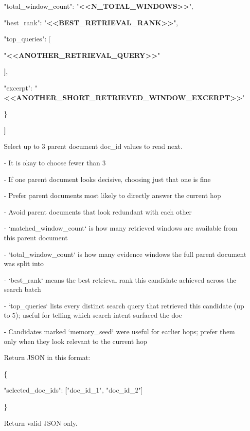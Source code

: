 \begin{tcolorbox}[colback=white, colframe=my-green, coltitle=black, parskip=5mm, title=\textbf{Document Choose}, halign=flush left, enhanced, breakable, skin first=enhanced, skin middle=enhanced, skin last=enhanced]
\begin{scriptsize}
    "total\_window\_count": "\textcolor{my-green}{\textbf{\textless{}\textless{}N\_TOTAL\_WINDOWS\textgreater{}\textgreater{}}}",\par
    "best\_rank": "\textcolor{my-green}{\textbf{\textless{}\textless{}BEST\_RETRIEVAL\_RANK\textgreater{}\textgreater{}}}",\par
    "top\_queries": [\par
      "\textcolor{my-green}{\textbf{\textless{}\textless{}ANOTHER\_RETRIEVAL\_QUERY\textgreater{}\textgreater{}}}"\par
    ],\par
    "excerpt": "\textcolor{my-green}{\textbf{\textless{}\textless{}ANOTHER\_SHORT\_RETRIEVED\_WINDOW\_EXCERPT\textgreater{}\textgreater{}}}"\par
  \}\par
]\par
\mbox{}\par
Select up to 3 parent document doc\_id values to read next.\par
- It is okay to choose fewer than 3\par
- If one parent document looks decisive, choosing just that one is fine\par
- Prefer parent documents most likely to directly answer the current hop\par
- Avoid parent documents that look redundant with each other\par
- `matched\_window\_count` is how many retrieved windows are available from this parent document\par
- `total\_window\_count` is how many evidence windows the full parent document was split into\par
- `best\_rank` means the best retrieval rank this candidate achieved across the search batch\par
- `top\_queries` lists every distinct search query that retrieved this candidate (up to 5); useful for telling which search intent surfaced the doc\par
- Candidates marked `memory\_seed` were useful for earlier hops; prefer them only when they look relevant to the current hop\par
\mbox{}\par
Return JSON in this format:\par
\{\par
  "selected\_doc\_ids": ["doc\_id\_1", "doc\_id\_2"]\par
\}\par
\mbox{}\par
Return valid JSON only.\par
\end{scriptsize}
\end{tcolorbox}

